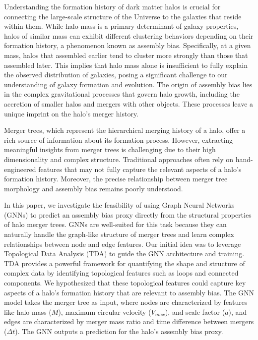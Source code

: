 \documentclass[twocolumn]{aastex631}
\begin{document}
Understanding the formation history of dark matter halos is crucial for connecting the large-scale structure of the Universe to the galaxies that reside within them. While halo mass is a primary determinant of galaxy properties, halos of similar mass can exhibit different clustering behaviors depending on their formation history, a phenomenon known as assembly bias. Specifically, at a given mass, halos that assembled earlier tend to cluster more strongly than those that assembled later. This implies that halo mass alone is insufficient to fully explain the observed distribution of galaxies, posing a significant challenge to our understanding of galaxy formation and evolution. The origin of assembly bias lies in the complex gravitational processes that govern halo growth, including the accretion of smaller halos and mergers with other objects. These processes leave a unique imprint on the halo's merger history.

Merger trees, which represent the hierarchical merging history of a halo, offer a rich source of information about its formation process. However, extracting meaningful insights from merger trees is challenging due to their high dimensionality and complex structure. Traditional approaches often rely on hand-engineered features that may not fully capture the relevant aspects of a halo's formation history. Moreover, the precise relationship between merger tree morphology and assembly bias remains poorly understood.

In this paper, we investigate the feasibility of using Graph Neural Networks (GNNs) to predict an assembly bias proxy directly from the structural properties of halo merger trees. GNNs are well-suited for this task because they can naturally handle the graph-like structure of merger trees and learn complex relationships between node and edge features. Our initial idea was to leverage Topological Data Analysis (TDA) to guide the GNN architecture and training. TDA provides a powerful framework for quantifying the shape and structure of complex data by identifying topological features such as loops and connected components. We hypothesized that these topological features could capture key aspects of a halo's formation history that are relevant to assembly bias. The GNN model takes the merger tree as input, where nodes are characterized by features like halo mass ($M$), maximum circular velocity ($V_{max}$), and scale factor ($a$), and edges are characterized by merger mass ratio and time difference between mergers ($\Delta t$). The GNN outputs a prediction for the halo's assembly bias proxy.
\end{document}
